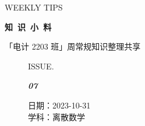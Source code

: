 \documentclass[UTF8]{ctexart}
\newcommand\Black[1]{\textcolor[gray]{0.3}{#1}}
\newcommand\Brown[1]{\textcolor[HTML]{998A4E}{#1}}
\newcommand\IssueNumber{07}
\newcommand\Date{2023-10-31}
\newcommand\Subject{离散数学}
\begin{document}
\BgThispage
\begin{center}
{\scriptsize\Issue \textcolor[HTML]{C8BA83}{WEEKLY TIPS}}

{\Huge\bfseries\TitleFont \Black{知\ 识\ 小\ 料}}

\vspace{-0.1cm}
{\footnotesize \Brown{「电计 2203 班」周常规知识整理共享}}
\end{center}

\vspace{-0.5cm}

\begin{figure}[H]
\hspace{1cm}
\begin{minipage}[t]{0.3\textwidth}
\centering
    \Brown{ISSUE.}

    \vspace{-0.6cm}
    \Huge \Issue\slshape\bfseries\Black{\IssueNumber}
\end{minipage}
\hfill
\begin{minipage}[t]{0.3\textwidth}
\centering
    \Brown{日期：\Date} \\
\vspace{-0.1cm}
    \Brown{学科：\Subject} \\
\end{minipage}
\vspace{-0.2cm}
\end{figure}
\end{document}
